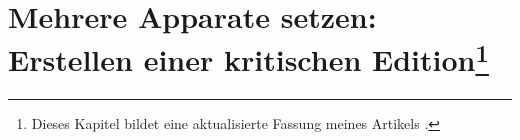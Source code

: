 
\chapter[Mehrere Apparate setzen: Erstellen einer kritischen Edition]{Mehrere Apparate setzen:\\Erstellen einer kritischen Edition\footnote{Dieses Kapitel bildet eine aktualisierte Fassung meines Artikels \cite{pilhofer:dtk2017}.}}




\label{reledmac}


\newcommand\vari[3][]{%
\edtext{#2}{%
  \if$#1$\lemma{\gkk{#2}}\else\lemma{\gkk{#1}}\fi
  \Cfootnote{#3}}}

\newcommand\quell[3][]{%
\edtext{#2}{%
  \if$#1$\lemma{\gkk{#2}}\else\lemma{\gkk{#1}}\fi
  \Bfootnote{#3}}}

\newsavebox\bspbox
\newenvironment{reledmacbsp}[1]{%
  \begin{minipage}[t]{0.95\linewidth}
  \beginnumbering
  #1%
  \pstart[\subsubsection*{Strabons Geographika XIV 5,1}]%
}%
{%
  \pend
  \stopmsdata
  \endnumbering
  \end{minipage}%
}

\newcommand\bsplineenum{\firstlinenum{2}\linenumincrement{2}}

\setcounter{alteSeite}{269}
\newcommand\alteSeite{{|\ledsidenote{\emph{T}~\thealteSeite}}}%

